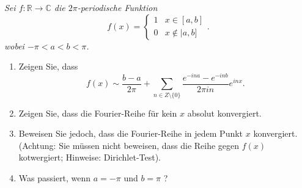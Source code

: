 \documentclass[11pt]{article}
\newenvironment{problem}[2][Beispiel]{
    \begin{trivlist}
        \item[\hskip \labelsep {\bfseries #1}\hskip \labelsep {\bfseries #2.}] \itshape}{
    \end{trivlist}\normalshape
}
\begin{document}
    \begin{problem}{3}
        Sei $f: \mathbb{R} \rightarrow \mathbb{C}$ die $2 \pi$-periodische Funktion
        $$
        f(x)=\left\{\begin{array}{ll}
                        1 & x \in[a, b] \\
                        0 & x \notin \mid a, b]
        \end{array} .\right.
        $$
        wobei $-\pi<a<b<\pi$.
        \begin{enumerate}[label = (\alph*)]
            \item Zeigen Sie, dass
            $$
            f(x) \sim \frac{b-a}{2 \pi}+\sum_{n \in Z\setminus\{0\}} \frac{e^{-i n a}-e^{-i n b}}{2 \pi i n}
            e^{i n x} .
            $$
            \item Zeigen Sie, dass die Fourier-Reihe für kein $x$ absolut konvergiert.
            \item Beweisen Sie jedoch, dass die Fourier-Reihe in jedem Punkt $x$ konvergiert. (Achtung: Sie
            müssen nicht beweisen, dass die Reihe gegen $f(x)$ kotwergiert; Hinweise: Dirichlet-Test).
            \item Was passiert, wenn $a=-\pi$ und $b=\pi$ ?
        \end{enumerate}
    \end{problem}
\end{document}
